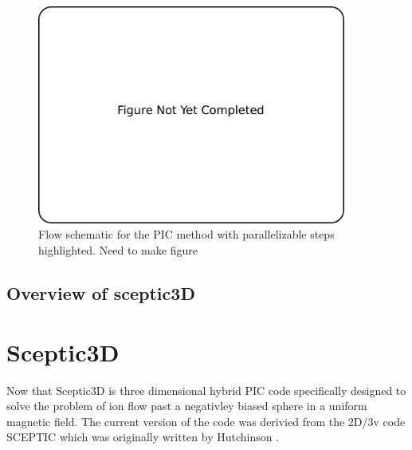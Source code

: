 \begin{figure}
\begin{center}
\includegraphics[width=4in]{introduction/not_finished.pdf}
\end{center}
\caption{Flow schematic for the PIC method with parallelizable steps highlighted. Need to make figure}
\label{fig:pic_flowchart_parallel}
\end{figure}

	
	\section{Overview of sceptic3D}











	\chapter{Sceptic3D}
Now that Sceptic3D is three dimensional hybrid PIC code specifically designed to solve the problem of ion flow past a negativley biased sphere in a uniform magnetic field. The current version of the code was derivied from the 2D/3v code SCEPTIC which was originally written by Hutchinson \cite{Hutchinson2002,Hutchinson2003,Hutchinson2005,Hutchinson2006}.



